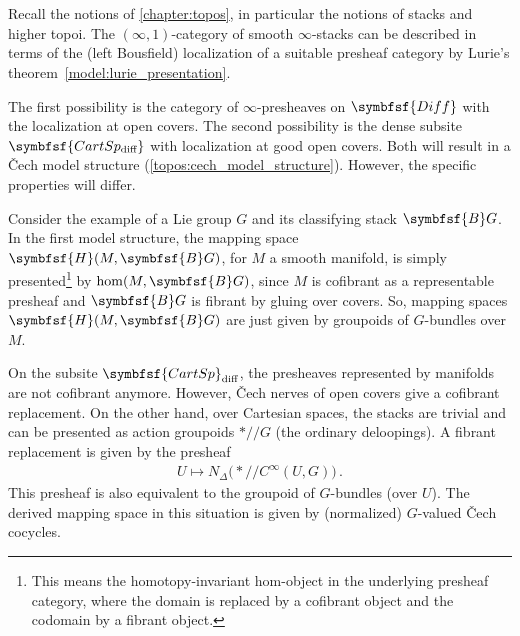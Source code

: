 \section{}

    Recall the notions of \cref{chapter:topos}, in particular the notions of stacks and higher topoi. The $(\infty,1)$-category of smooth $\infty$-stacks can be described in terms of the (left Bousfield) localization of a suitable presheaf category by Lurie's theorem~\ref{model:lurie_presentation}.

    The first possibility is the category of $\infty$-presheaves on $\symbfsf{Diff}$ with the localization at open covers. The second possibility is the dense subsite $\symbfsf{CartSp_{\text{diff}}}$ with localization at good open covers. Both will result in a \v{C}ech model structure (\cref{topos:cech_model_structure}). However, the specific properties will differ.

    \begin{example}
        Consider the example of a Lie group $G$ and its classifying stack $\symbfsf{B}G$. In the first model structure, the mapping space $\symbfsf{H}(M,\symbfsf{B}G)$, for $M$ a smooth manifold, is simply presented\footnote{This means the homotopy-invariant hom-object in the underlying presheaf category, where the domain is replaced by a cofibrant object and the codomain by a fibrant object.} by $\hom(M,\symbfsf{B}G)$, since $M$ is cofibrant as a representable presheaf and $\symbfsf{B}G$ is fibrant by gluing over covers. So, mapping spaces $\symbfsf{H}(M,\symbfsf{B}G)$ are just given by groupoids of $G$-bundles over $M$.

        On the subsite $\symbfsf{CartSp}_{\text{diff}}$, the presheaves represented by manifolds are not cofibrant anymore. However, \v{C}ech nerves of open covers give a cofibrant replacement. On the other hand, over Cartesian spaces, the stacks are trivial and can be presented as action groupoids $\ast/\!\!/G$ (the ordinary deloopings). A fibrant replacement is given by the presheaf
        \begin{gather}
            U\mapsto N_\Delta\bigl(\ast/\!\!/C^\infty(U,G)\bigr)\,.
        \end{gather}
        This presheaf is also equivalent to the groupoid of $G$-bundles (over $U$). The derived mapping space in this situation is given by (normalized) $G$-valued \v{C}ech cocycles.
    \end{example}

